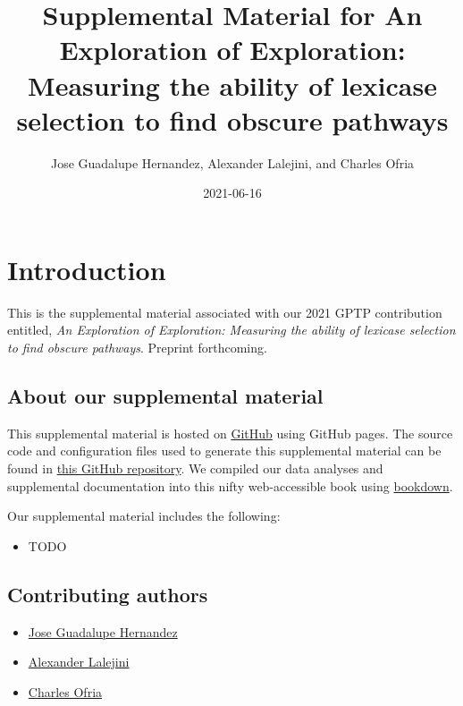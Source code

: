\documentclass[]{book}
\title{Supplemental Material for An Exploration of Exploration: Measuring the ability of lexicase selection to find obscure pathways}
\author{Jose Guadalupe Hernandez, Alexander Lalejini, and Charles Ofria}
\date{2021-06-16}
\providecommand{\tightlist}{%
  \setlength{\itemsep}{0pt}\setlength{\parskip}{0pt}}
\begin{document}
\maketitle

{
\setcounter{tocdepth}{1}
\tableofcontents
}
\hypertarget{introduction}{%
\chapter{Introduction}\label{introduction}}

This is the supplemental material associated with our 2021 GPTP contribution entitled, \emph{An Exploration of Exploration: Measuring the ability of lexicase selection to find obscure pathways}.
Preprint forthcoming.

\hypertarget{about-our-supplemental-material}{%
\section{About our supplemental material}\label{about-our-supplemental-material}}

This supplemental material is hosted on \href{https://github.com}{GitHub} using GitHub pages.
The source code and configuration files used to generate this supplemental material can be found in \href{https://github.com/jgh9094/GPTP-2021-Exploration-Of-Exploration}{this GitHub repository}.
We compiled our data analyses and supplemental documentation into this nifty web-accessible book using \href{https://bookdown.org/}{bookdown}.

Our supplemental material includes the following:

\begin{itemize}
\tightlist
\item
  TODO
\end{itemize}

\hypertarget{contributing-authors}{%
\section{Contributing authors}\label{contributing-authors}}

\begin{itemize}
\tightlist
\item
  \href{https://jgh9094.github.io/}{Jose Guadalupe Hernandez}
\item
  \href{https://lalejini.com}{Alexander Lalejini}
\item
  \href{http://ofria.com}{Charles Ofria}
\end{itemize}
\end{document}
